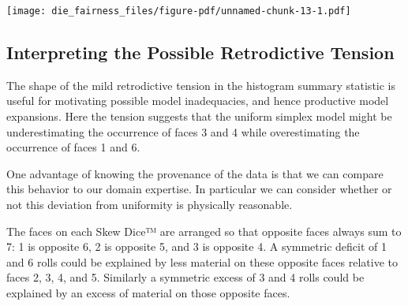 \documentclass[
  letterpaper,
  DIV=11,
  numbers=noendperiod]{scrartcl}
\newenvironment{Shaded}{\begin{snugshade}}{\end{snugshade}}
\newcommand{\AttributeTok}[1]{\textcolor[rgb]{0.40,0.45,0.13}{#1}}
\newcommand{\ControlFlowTok}[1]{\textcolor[rgb]{0.00,0.23,0.31}{#1}}
\newcommand{\DecValTok}[1]{\textcolor[rgb]{0.68,0.00,0.00}{#1}}
\newcommand{\FunctionTok}[1]{\textcolor[rgb]{0.28,0.35,0.67}{#1}}
\newcommand{\NormalTok}[1]{\textcolor[rgb]{0.00,0.23,0.31}{#1}}
\newcommand{\OtherTok}[1]{\textcolor[rgb]{0.00,0.23,0.31}{#1}}
\newcommand{\SpecialCharTok}[1]{\textcolor[rgb]{0.37,0.37,0.37}{#1}}
\newcommand{\StringTok}[1]{\textcolor[rgb]{0.13,0.47,0.30}{#1}}
\begin{document}
\begin{Shaded}
\end{Shaded}

\texttt{[image: die\_fairness\_files/figure-pdf/unnamed-chunk-13-1.pdf]}

\subsection{Interpreting the Possible Retrodictive
Tension}\label{interpreting-the-possible-retrodictive-tension}

The shape of the mild retrodictive tension in the histogram summary
statistic is useful for motivating possible model inadequacies, and
hence productive model expansions. Here the tension suggests that the
uniform simplex model might be underestimating the occurrence of faces 3
and 4 while overestimating the occurrence of faces 1 and 6.

One advantage of knowing the provenance of the data is that we can
compare this behavior to our domain expertise. In particular we can
consider whether or not this deviation from uniformity is physically
reasonable.

The faces on each Skew Dice™ are arranged so that opposite faces always
sum to 7: 1 is opposite 6, 2 is opposite 5, and 3 is opposite 4. A
symmetric deficit of 1 and 6 rolls could be explained by less material
on these opposite faces relative to faces 2, 3, 4, and 5. Similarly a
symmetric excess of 3 and 4 rolls could be explained by an excess of
material on those opposite faces.
\end{document}
